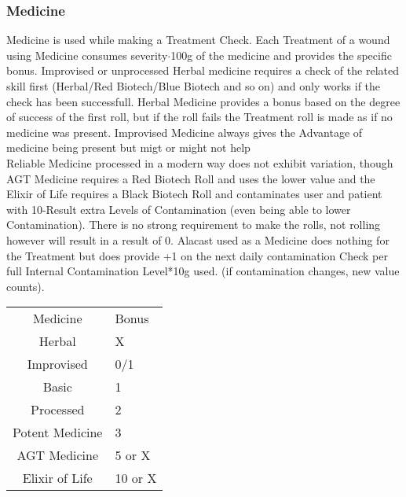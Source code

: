     \subsubsection{Medicine}
    Medicine is used while making a Treatment Check.
    Each Treatment of a wound using Medicine consumes
    severity\(\cdot\)100g of the medicine and provides the specific bonus.
    Improvised or unprocessed Herbal medicine
    requires a check of the related skill first (Herbal/Red Biotech/Blue Biotech and so on) and only works if the check
    has been successfull.
    Herbal Medicine provides a bonus based on the degree of success of the first roll, but if the
    roll fails the Treatment roll is made as if no medicine was present.
    Improvised Medicine always gives the Advantage
    of medicine being present but migt or might not help\\
    Reliable Medicine processed in a modern way does not exhibit variation, though AGT Medicine requires a Red Biotech
    Roll and uses the lower value and the Elixir of Life requires a Black Biotech Roll and contaminates user and patient
    with 10-Result extra Levels of Contamination (even being able to lower Contamination).
    There is no strong
    requirement to make the rolls, not rolling however will result in a result of 0.
    Alacast used as a Medicine does nothing for the Treatment but does provide +1 on the next daily contamination Check
    per full Internal Contamination Level*10g used. (if contamination changes, new value counts).
    \begin{tabular}{cl}
        Medicine & Bonus\\
        Herbal & X\\
        Improvised & 0/1\\
        Basic & 1\\
        Processed & 2\\
        Potent Medicine & 3\\
        AGT Medicine & 5 or X\\
        Elixir of Life & 10 or X\\
    \end{tabular}\vspace{1.5cm}
